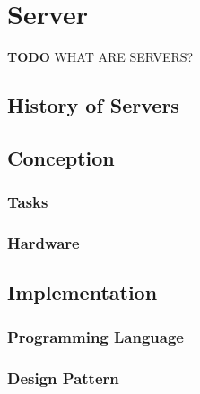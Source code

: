 \chapter{Server}
\label{ch:server}

\textbf{TODO} WHAT ARE SERVERS?

\section{History of Servers}

\section{Conception}
\subsection{Tasks}
\subsection{Hardware}

\section{Implementation}
\subsection{Programming Language}
\subsection{Design Pattern}
